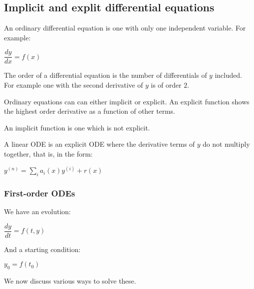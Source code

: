 
\subsection{Implicit and explit differential equations}

An ordinary differential equation is one with only one independent variable. For example:

\(\dfrac{dy}{dx}=f(x)\)

The order of a differential equation is the number of differentials of \(y\) included. For example one with the second derivative of \(y\) is of order \(2\).

Ordinary equations can can either implicit or explicit. An explicit function shows the highest order derivative as a function of other terms.

An implicit function is one which is not explicit.

A linear ODE is an explicit ODE where the derivative terms of \(y\) do not multiply together, that is, in the form:

\(y^{(n)}=\sum_ia_i(x)y^{(i)}+r(x)\)

\subsubsection{First-order ODEs}

We have an evolution:

\(\dfrac{dy}{dt}=f(t,y)\)

And a starting condition:

\(y_0=f(t_0)\)

We now discuss various ways to solve these.

